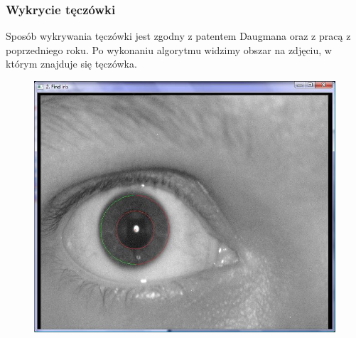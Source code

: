 \documentclass{beamer}
\begin{document}

\begin{frame}
\frametitle{Wykrycie tęczówki}
Sposób wykrywania tęczówki jest zgodny z patentem Daugmana oraz z pracą z poprzedniego roku. Po wykonaniu algorytmu widzimy obszar na zdjęciu, w którym znajduje się tęczówka.
\begin{figure}
\begin{center}
\includegraphics[scale=0.25]{teczowka_nasza.jpg}
\end{center}
\end{figure}
\end{frame}

\end{document}
